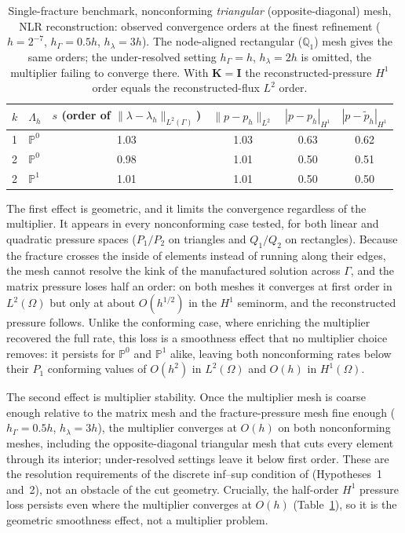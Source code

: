 \documentclass[a4paper,fleqn]{cas-sc}
\newcommand{\Kmat}{\mathbf{K}}
\begin{document}
\begin{table}[H]
\centering
\caption{Single-fracture benchmark, nonconforming \emph{triangular}
(opposite-diagonal) mesh, NLR reconstruction: observed convergence orders at the
finest refinement (\(h=2^{-7}\), \(h_\Gamma=0.5h\), \(h_\lambda=3h\)). The
node-aligned rectangular (\(\mathbb{Q}_1\)) mesh gives the same orders; the
under-resolved setting \(h_\Gamma=h\), \(h_\lambda=2h\) is omitted, the multiplier
failing to converge there. With \(\Kmat=\mathbf{I}\) the reconstructed-pressure
\(H^1\) order equals the reconstructed-flux \(L^2\) order.}
\label{tab:single_fracture_nonconforming_orders}
\begin{tabular}{llcccc}
\toprule
\(k\) & \(\Lambda_h\) &
\(s\) (order of \(\|\lambda-\lambda_h\|_{L^2(\Gamma)}\)) &
\(\|p-p_h\|_{L^2}\) &
\(|p-p_h|_{H^1}\) &
\(|p-\widetilde p_h|_{H^1}\)\\
\midrule
1 & \(\mathbb{P}^0\) & 1.03 & 1.03 & 0.63 & 0.62\\
2 & \(\mathbb{P}^0\) & 0.98 & 1.01 & 0.50 & 0.51\\
2 & \(\mathbb{P}^1\) & 1.01 & 1.01 & 0.50 & 0.50\\
\bottomrule
\end{tabular}
\end{table}

The first effect is geometric, and it limits the convergence regardless of the
multiplier. It appears in every nonconforming case tested, for both linear and
quadratic pressure spaces (\(P_1/P_2\) on triangles and \(Q_1/Q_2\) on
rectangles). Because the fracture crosses the inside of elements instead of
running along their edges, the mesh cannot resolve the kink of the manufactured
solution across \(\Gamma\), and the matrix pressure loses half an order: on both
meshes it converges at first order in \(L^2(\Omega)\) but only at about
\(O(h^{1/2})\) in the \(H^1\) seminorm, and the reconstructed pressure follows.
Unlike the conforming case, where enriching the multiplier recovered the full
rate, this loss is a smoothness effect that no multiplier choice removes: it
persists for \(\mathbb{P}^0\) and \(\mathbb{P}^1\) alike, leaving both
nonconforming rates below their \(P_1\) conforming values of \(O(h^2)\) in
\(L^2(\Omega)\) and \(O(h)\) in \(H^1(\Omega)\).

The second effect is multiplier stability. Once the multiplier mesh is coarse
enough relative to the matrix mesh and the fracture-pressure mesh fine enough
(\(h_\Gamma=0.5h\), \(h_\lambda=3h\)), the multiplier converges at \(O(h)\) on both
nonconforming meshes, including the opposite-diagonal triangular mesh that cuts
every element through its interior; under-resolved settings leave it below first
order. These are the resolution requirements of the discrete inf--sup condition of
\citet{Koeppel2019} (Hypotheses~1 and~2), not an obstacle of the cut geometry.
Crucially, the half-order \(H^1\) pressure loss persists even where the multiplier
converges at \(O(h)\) (Table~\ref{tab:single_fracture_nonconforming_orders}), so it
is the geometric smoothness effect, not a multiplier problem.
\end{document}
